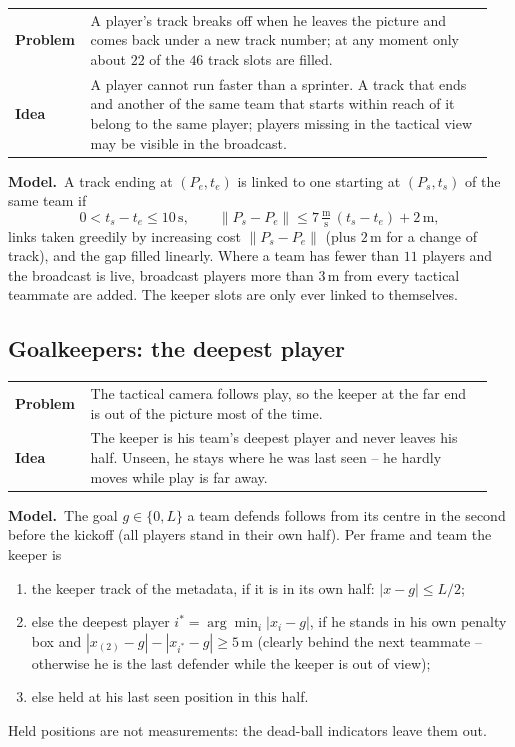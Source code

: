 \documentclass[11pt,a4paper]{article}
\makeatletter
\newcommand{\triple}[3]{%
  \par\medskip\noindent
  \begin{tabular}{@{}p{0.13\linewidth}@{\hspace{0.6em}}p{0.82\linewidth}@{}}
  \textbf{Problem} & #1\\[0.3em]
  \textbf{Idea}    & #2
  \end{tabular}\par\smallskip\noindent
  \textbf{Model.}\ #3\par\medskip}
\newcommand{\norm}[1]{\left\lVert #1 \right\rVert}
\makeatother
\begin{document}
\triple{A player's track breaks off when he leaves the picture and comes back under a new
track number; at any moment only about $22$ of the $46$ track slots are filled.}
{A player cannot run faster than a sprinter. A track that ends and another of the same team
that starts within reach of it belong to the same player; players missing in the tactical
view may be visible in the broadcast.}
{A track ending at $(P_e,t_e)$ is linked to one starting at $(P_s,t_s)$ of the same team if
\begin{equation}
  0<t_s-t_e\le 10\,\text{s},\qquad \norm{P_s-P_e}\le 7\,\tfrac{\text{m}}{\text{s}}\,(t_s-t_e)+2\,\text{m},
\end{equation}
links taken greedily by increasing cost $\norm{P_s-P_e}$ (plus $2$\,m for a change of
track), and the gap filled linearly. Where a team has fewer than $11$ players and the
broadcast is live, broadcast players more than $3$\,m from every tactical teammate are added.
The keeper slots are only ever linked to themselves.}

\subsection{Goalkeepers: the deepest player}\label{sec:keeper}

\triple{The tactical camera follows play, so the keeper at the far end is out of the
picture most of the time.}
{The keeper is his team's deepest player and never leaves his half. Unseen, he stays where
he was last seen -- he hardly moves while play is far away.}
{The goal $g\in\{0,L\}$ a team defends follows from its centre in the second before the
kickoff (all players stand in their own half). Per frame and team the keeper is
\begin{enumerate}[leftmargin=1.5em, label=(\roman*)]
\item the keeper track of the metadata, if it is in its own half: $|x-g|\le L/2$;
\item else the deepest player $i^\ast=\arg\min_i|x_i-g|$, if he stands in his own penalty box
  and $|x_{(2)}-g|-|x_{i^\ast}-g|\ge 5$\,m (clearly behind the next teammate -- otherwise he
  is the last defender while the keeper is out of view);
\item else held at his last seen position in this half.
\end{enumerate}
Held positions are not measurements: the dead-ball indicators leave them out.}
\end{document}
